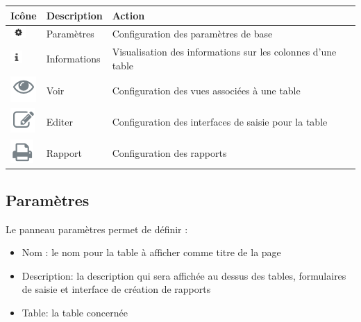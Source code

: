 \documentclass[letterpaper,10pt,english]{sphinxmanual}
\begin{document}
\begin{tabulary}{\linewidth}{|L|L|L|}
\hline

\textbf{Icône}
 & 
\textbf{Description}
 & 
\textbf{Action}
\\
\hline
\includegraphics{process2.png}
 & 
Paramètres
 & 
Configuration des paramètres de base
\\
\hline
\includegraphics{info2.png}
 & 
Informations
 & 
Visualisation des informations sur les colonnes d'une table
\\
\hline
\includegraphics{preview1.png}
 & 
Voir
 & 
Configuration des vues associées à une table
\\
\hline
\includegraphics{pencil1.png}
 & 
Editer
 & 
Configuration des interfaces de saisie pour la table
\\
\hline
\includegraphics{report1.png}
 & 
Rapport
 & 
Configuration des rapports
\\
\hline\end{tabulary}



\subsection{Paramètres}
\label{tables/infopanel:parametres}\label{tables/infopanel:tables-param}
Le panneau paramètres permet de définir :
\begin{itemize}
\item {} 
Nom : le nom pour la table à afficher comme titre de la page

\item {} 
Description: la description qui sera affichée au dessus des tables, formulaires de saisie et interface de création de rapports

\item {} 
Table: la table concernée

\end{itemize}
\end{document}
